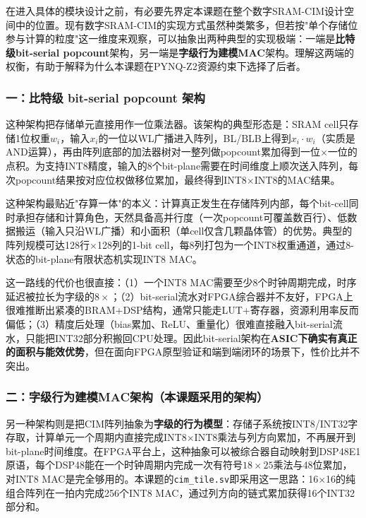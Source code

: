 \documentclass[12pt, a4paper]{article}
\begin{document}
在进入具体的模块设计之前，有必要先界定本课题在整个数字SRAM-CIM设计空间中的位置。现有数字SRAM-CIM的实现方式虽然种类繁多，但若按"单个存储位参与计算的粒度"这一维度来观察，可以抽象出两种典型的实现极端：一端是\textbf{比特级bit-serial popcount}架构，另一端是\textbf{字级行为建模MAC}架构。理解这两端的权衡，有助于解释为什么本课题在PYNQ-Z2资源约束下选择了后者。

\subsubsection{一：比特级 bit-serial popcount 架构}

这种架构把存储单元直接用作一位乘法器。该架构的典型形态是：SRAM cell只存储1位权重$w_i$，输入$x_i$的一位以WL广播进入阵列，BL/BLB上得到$x_i \cdot w_i$（实质是AND运算），再由阵列底部的加法器树对一整列做popcount累加得到一位×一位的点积。为支持INT8精度，输入的8个bit-plane需要在时间维度上顺次送入阵列，每次popcount结果按对应位权做移位累加，最终得到INT8$\times$INT8的MAC结果。

这种架构最贴近"存算一体"的本义：计算真正发生在存储阵列内部，每个bit-cell同时承担存储和计算角色，天然具备高并行度（一次popcount可覆盖数百行）、低数据搬运（输入只沿WL广播）和小面积（单cell仅含几颗晶体管）的优势。典型的阵列规模可达128行$\times$128列的1-bit cell，每8列打包为一个INT8权重通道，通过8-状态的bit-plane有限状态机实现INT8 MAC。

这一路线的代价也很直接：（1）一个INT8 MAC需要至少8个时钟周期完成，时序延迟被拉长为字级的$8\times$；（2）bit-serial流水对FPGA综合器并不友好，FPGA上很难推断出紧凑的BRAM+DSP结构，通常只能走LUT+寄存器，资源利用率反而偏低；（3）精度后处理（bias累加、ReLU、重量化）很难直接融入bit-serial流水，只能把INT32部分积搬回CPU处理。因此bit-serial架构在\textbf{ASIC下确实有真正的面积与能效优势}，但在面向FPGA原型验证和端到端闭环的场景下，性价比并不突出。

\subsubsection{二：字级行为建模MAC架构（本课题采用的架构）}

另一种架构则是把CIM阵列抽象为\textbf{字级的行为模型}：存储子系统按INT8/INT32字存取，计算单元一个周期内直接完成INT8$\times$INT8乘法与列方向累加，不再展开到bit-plane时间维度。在FPGA平台上，这种抽象可以被综合器自动映射到DSP48E1原语，每个DSP48能在一个时钟周期内完成一次有符号$18\times25$乘法与48位累加，对INT8 MAC是完全够用的。本课题的\texttt{cim\_tile.sv}即采用这一思路：16$\times$16的纯组合阵列在一拍内完成256个INT8 MAC，通过列方向的链式累加获得16个INT32部分和。
\end{document}
